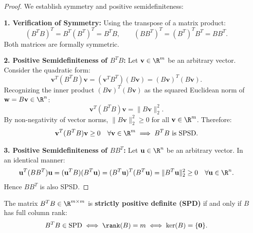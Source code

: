 \begin{proof}
We establish symmetry and positive semidefiniteness:

\medskip
\noindent\textbf{1. Verification of Symmetry:}
Using the transpose of a matrix product:
\begin{equation}
    (B^T B)^T = B^T (B^T)^T = B^T B, \qquad (B B^T)^T = (B^T)^T B^T = B B^T.
\end{equation}
Both matrices are formally symmetric.

\medskip
\noindent\textbf{2. Positive Semidefiniteness of $B^T B$:}
Let $\mathbf{v} \in \R^m$ be an arbitrary vector. Consider the quadratic form:
\begin{equation}
    \mathbf{v}^T (B^T B) \mathbf{v} = (\mathbf{v}^T B^T)(B \mathbf{v}) = (B \mathbf{v})^T (B \mathbf{v}).
\end{equation}
Recognizing the inner product $(B\mathbf{v})^T (B\mathbf{v})$ as the squared Euclidean norm of $\mathbf{w} = B\mathbf{v} \in \R^n$:
\begin{equation}
    \mathbf{v}^T (B^T B) \mathbf{v} = \|B \mathbf{v}\|_2^2.
\end{equation}
By non-negativity of vector norms, $\|B \mathbf{v}\|_2^2 \ge 0$ for all $\mathbf{v} \in \R^m$. Therefore:
\begin{equation}
    \mathbf{v}^T (B^T B) \mathbf{v} \ge 0 \quad \forall \mathbf{v} \in \R^m \implies B^T B \text{ is SPSD}.
\end{equation}

\medskip
\noindent\textbf{3. Positive Semidefiniteness of $B B^T$:}
Let $\mathbf{u} \in \R^n$ be an arbitrary vector. In an identical manner:
\begin{equation}
    \mathbf{u}^T (B B^T) \mathbf{u} = (\mathbf{u}^T B)(B^T \mathbf{u}) = (B^T \mathbf{u})^T (B^T \mathbf{u}) = \|B^T \mathbf{u}\|_2^2 \ge 0 \quad \forall \mathbf{u} \in \R^n.
\end{equation}
Hence $B B^T$ is also SPSD.
\end{proof}

\begin{corollary}
The matrix $B^T B \in \R^{m \times m}$ is \textbf{strictly positive definite (SPD)} if and only if $B$ has full column rank:
\begin{equation}
    B^T B \in \text{SPD} \iff \rank(B) = m \iff \ker(B) = \{\mathbf{0}\}.
\end{equation}
\end{corollary}

